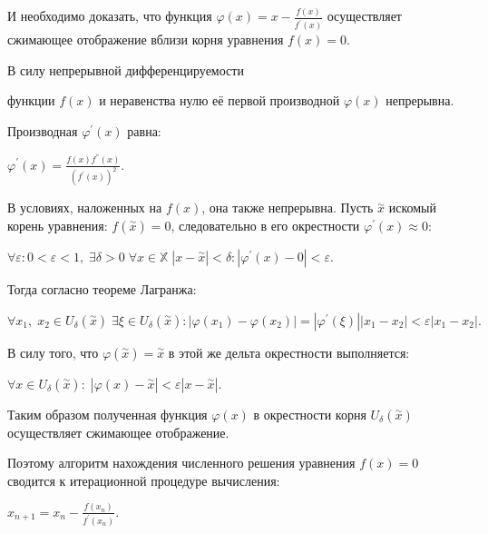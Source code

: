 \documentclass[a4paper]{article}
\begin{document}
{{{{{{{{{И необходимо доказать, что функция {{\(\varphi(x) = x - \frac{f(x)}{f^{\prime}(x)}\)}}
осуществляет сжимающее отображение вблизи корня уравнения
{\(f(x) = 0\)}.

В силу непрерывной дифференцируемости} функции {\(f(x)\)} и неравенства нулю её первой производной {\(\varphi(x)\)} непрерывна.

Производная {\(\varphi^{\prime}(x)\)} равна:

\begin{center}
 {\(\varphi^{\prime}(x) = \frac{f(x)f^{''}(x)}{\left( {f^{\prime}(x)} \right)^{2}}.\)}
\end{center}

В условиях, наложенных на
{\(f(x)\)}, она также непрерывна. Пусть {\(\overset{\sim}{x}\)}
искомый корень уравнения: {\(f(\overset{\sim}{x}) = 0\)},
следовательно в его окрестности {\(\varphi^{\prime}(x) \approx 0\)}:

\begin{center}
 {\(\forall\varepsilon:0 < \varepsilon < 1,\;\exists\delta > 0\;\forall x \in \mathbb{X}\;|x - \overset{\sim}{x}| < \delta:|\varphi^{\prime}(x) - 0| < \varepsilon.\)}
\end{center}

Тогда согласно теореме Лагранжа:

\begin{center}
 {\(\forall x_{1},\; x_{2} \in U_{\delta}(\overset{\sim}{x})\;\exists\xi \in U_{\delta}(\overset{\sim}{x}):|\varphi(x_{1}) - \varphi(x_{2})| = |\varphi^{\prime}(\xi)||x_{1} - x_{2}| < \varepsilon|x_{1} - x_{2}|.\)}
\end{center}

В силу того, что {\(\varphi(\overset{\sim}{x}) = \overset{\sim}{x}\)} в этой же дельта окрестности выполняется:

\begin{center}
 {\(\forall x \in U_{\delta}(\overset{\sim}{x}):\;|\varphi(x) - \overset{\sim}{x}| < \varepsilon|x - \overset{\sim}{x}|.\)}
\end{center}

Таким образом полученная функция {\(\varphi(x)\)} в окрестности корня {\(U_{\delta}(\overset{\sim}{x})\)} осуществляет сжимающее отображение.


Поэтому алгоритм нахождения численного решения уравнения {\(f(x) = 0\)} сводится к итерационной процедуре вычисления:

\begin{center}
 {\(x_{n + 1} = x_{n} - \frac{f(x_{n})}{f^{\prime}(x_{n})}.\)}
\end{center}

}}}}}}}}
\end{document}

